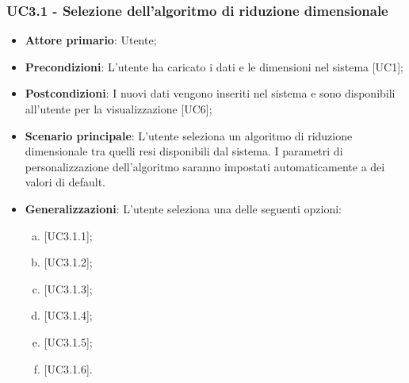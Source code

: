 \subsubsection{UC3.1 - Selezione dell'algoritmo di riduzione dimensionale}
\begin{itemize}
	\item \textbf{Attore primario}: Utente;
	\item \textbf{Precondizioni}: L'utente ha caricato i dati e le dimensioni nel sistema [UC1];
	\item \textbf{Postcondizioni}: I nuovi dati vengono inseriti nel sistema e sono disponibili all'utente per la visualizzazione [UC6];
	\item \textbf{Scenario principale}: L'utente seleziona un algoritmo di riduzione dimensionale tra quelli resi disponibili dal sistema. I parametri di personalizzazione dell'algoritmo saranno impostati automaticamente a dei valori di default.
	\item \textbf{Generalizzazioni}: L'utente seleziona una delle seguenti opzioni:
	\begin{enumerate}[(a)]
		\item {} [UC3.1.1];
		\item {} [UC3.1.2];
		\item {} [UC3.1.3];
		\item {} [UC3.1.4];
		\item {} [UC3.1.5];
		\item {} [UC3.1.6].
		
	\end{enumerate}
\end{itemize}